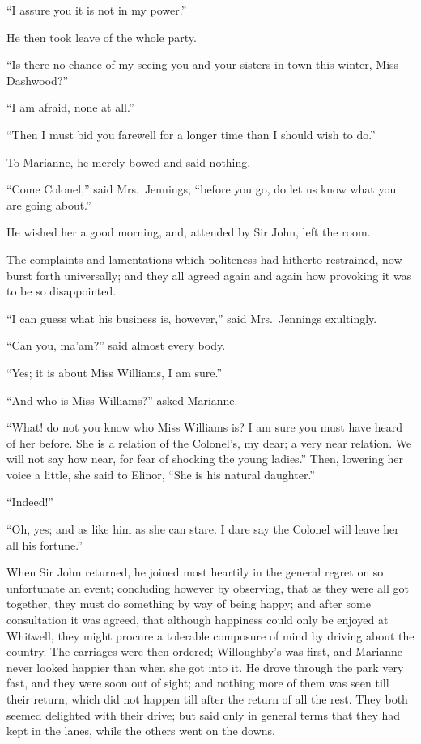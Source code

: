 ``I assure you it is not in my power.''

He then took leave of the whole party.

``Is there no chance of my seeing you and your sisters
in town this winter, Miss Dashwood?''

``I am afraid, none at all.''

``Then I must bid you farewell for a longer time
than I should wish to do.''

To Marianne, he merely bowed and said nothing.

``Come Colonel,'' said Mrs.\ Jennings, ``before you go,
do let us know what you are going about.''

He wished her a good morning, and, attended by Sir John,
left the room.

The complaints and lamentations which politeness
had hitherto restrained, now burst forth universally;
and they all agreed again and again how provoking it was
to be so disappointed.

``I can guess what his business is, however,''
said Mrs.\ Jennings exultingly.

``Can you, ma'am?'' said almost every body.

``Yes; it is about Miss Williams, I am sure.''

``And who is Miss Williams?'' asked Marianne.

``What! do not you know who Miss Williams is? I am
sure you must have heard of her before.  She is a relation
of the Colonel's, my dear; a very near relation.  We will
not say how near, for fear of shocking the young ladies.''
Then, lowering her voice a little, she said to Elinor,
``She is his natural daughter.''

``Indeed!''

``Oh, yes; and as like him as she can stare.
I dare say the Colonel will leave her all his fortune.''

When Sir John returned, he joined most heartily
in the general regret on so unfortunate an event;
concluding however by observing, that as they were
all got together, they must do something by way of
being happy; and after some consultation it was agreed,
that although happiness could only be enjoyed at Whitwell,
they might procure a tolerable composure of mind by driving
about the country.  The carriages were then ordered;
Willoughby's was first, and Marianne never looked
happier than when she got into it.  He drove through
the park very fast, and they were soon out of sight;
and nothing more of them was seen till their return,
which did not happen till after the return of all the rest.
They both seemed delighted with their drive; but said
only in general terms that they had kept in the lanes,
while the others went on the downs.

